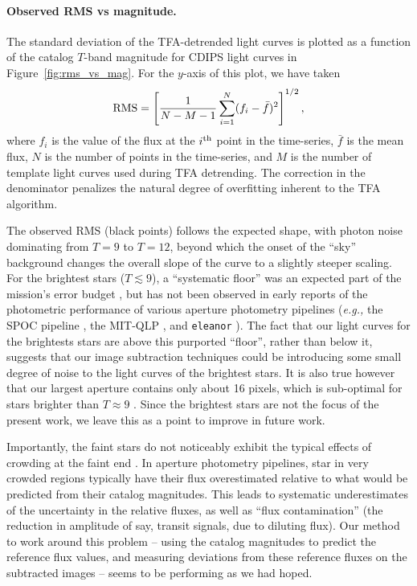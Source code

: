 \documentclass[12pt,twocolumn,tighten]{aastex62}
\begin{document}
\paragraph{Observed RMS vs magnitude.}
The standard deviation of the TFA-detrended light curves is plotted as
a function of the catalog $T$-band magnitude for CDIPS light curves in
Figure~\ref{fig:rms_vs_mag}.
For the $y$-axis of this plot, we have taken
\begin{equation}
  {\rm RMS} = \left[
    \frac{1}{N-M-1}
    \sum_{i=1}^{N} (f_i - \bar{f})^2
  \right]^{1/2},
\end{equation}
where $f_i$ is the value of the flux at the $i^{\rm th}$ point in the
time-series, $\bar{f}$ is the mean flux, $N$ is the
number of points in the time-series, and $M$ is the number
of template light curves used during TFA detrending.
The correction in the denominator penalizes the natural degree of
overfitting inherent to the TFA algorithm.

The observed RMS (black points) follows the expected shape,
with photon noise dominating from $T=9$ to $T=12$, beyond which the
onset of the ``sky'' background changes the overall slope of the
curve to a slightly steeper scaling.
For the brightest stars ($T\lesssim 9$), a ``systematic floor'' was an
expected part of the mission's error budget \citep{ricker_transiting_2015}, 
but 
has not been observed in early
reports of the photometric performance of various aperture photometry
pipelines ({\it e.g.,} the SPOC pipeline \citealt{jenkins_spoc_2010},
the MIT-QLP \citealt{huang_tess_2018}, and \texttt{eleanor}
\citealt{feinstein_eleanor_2019}).
The fact that our light curves for the brightests stars are above this
purported ``floor'', rather than below it, suggests that our
image subtraction techniques could be introducing some small degree of
noise to the light curves of the brightest stars.
It is also true however that our largest aperture contains only about
16 pixels, which is sub-optimal for stars brighter than $T\approx9$
\citep[see][Figure~14]{Sullivan_et_al_2015}.
Since the brightest stars are not the focus of the present work, we
leave this as a point to improve in future work.

Importantly, the faint stars do not noticeably exhibit
the typical effects of crowding at the faint end 
\citep[{\it e.g.},][Figure~5]{feinstein_eleanor_2019}.
In aperture photometry pipelines, star in very crowded regions typically 
have their flux overestimated relative to what would be predicted from their
catalog magnitudes.
This leads to systematic underestimates of the uncertainty in the relative 
fluxes, as well as ``flux contamination'' (the reduction in amplitude of say, 
transit signals, due to diluting flux).
Our method to work around this problem -- using the catalog magnitudes to 
predict the reference flux values, and measuring deviations from these 
reference fluxes on the subtracted images -- seems to be performing as we had 
hoped.
\end{document}
